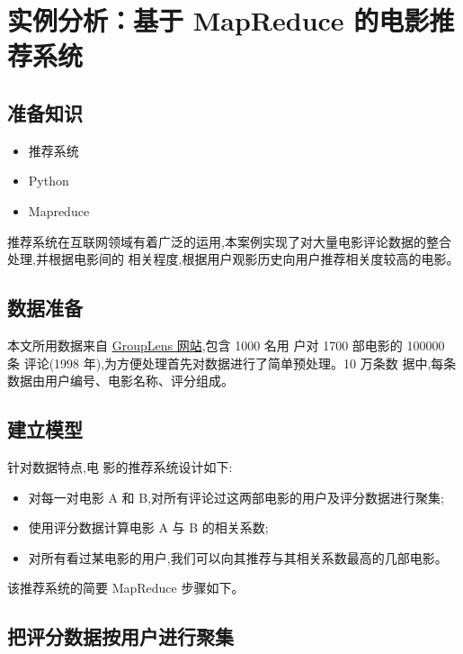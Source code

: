 \section{实例分析：基于 MapReduce
的电影推荐系统}\label{ux5b9eux4f8bux5206ux6790ux57faux4e8e-mapreduce-ux7684ux7535ux5f71ux63a8ux8350ux7cfbux7edf}

\subsection{准备知识}\label{ux51c6ux5907ux77e5ux8bc6}

\begin{itemize}
\itemsep1pt\parskip0pt
\item
  推荐系统
\item
  Python
\item
  Mapreduce
\end{itemize}

推荐系统在互联网领域有着广泛的运用,本案例实现了对大量电影评论数据的整合处理,并根据电影间的
相关程度,根据用户观影历史向用户推荐相关度较高的电影。

\subsection{数据准备}\label{ux6570ux636eux51c6ux5907}

本文所用数据来自
\href{http://grouplens.org/datasets/movielens/}{GroupLens 网站},包含
1000 名用 户对 1700 部电影的 100000 条 评论(1998
年),为方便处理首先对数据进行了简单预处理。10 万条数
据中,每条数据由用户编号、电影名称、评分组成。

\subsection{建立模型}\label{ux5efaux7acbux6a21ux578b}

针对数据特点,电 影的推荐系统设计如下:

\begin{itemize}
\item
  对每一对电影 A 和 B,对所有评论过这两部电影的用户及评分数据进行聚集;
\item
  使用评分数据计算电影 A 与 B 的相关系数;
\item
  对所有看过某电影的用户,我们可以向其推荐与其相关系数最高的几部电影。
\end{itemize}

该推荐系统的简要 MapReduce 步骤如下。

\subsection{把评分数据按用户进行聚集}\label{ux628aux8bc4ux5206ux6570ux636eux6309ux7528ux6237ux8fdbux884cux805aux96c6}

